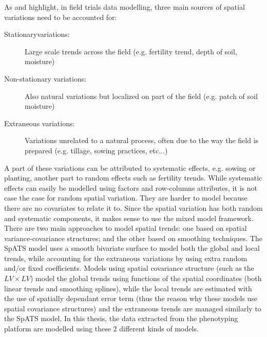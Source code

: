 As \textcite{wilkinson_nearest_1983} and \textcite{gilmour_accounting_1997} highlight, in field trials data modelling, three main sources of spatial variations need to be accounted for:
\begin{description}
    \item[Stationary\footnotemark variations:] Large scale trends across the field (e.g. fertility trend, depth of soil, moisture)
    \item[Non-stationary variations:] Also natural variations but localized on part of the field (e.g. patch of soil moisture)
    \item[Extraneous variations:] Variations unrelated to a natural process, often due to the way the field is prepared (e.g. 
    tillage, sowing practices, etc$\ldots$)
\end{description}
A part of these variations can be attributed to systematic effects, e.g. sowing or planting, another part to random effects such as fertility trends. While systematic effects can easily be modelled using factors and row-columns attributes, it is not case the case for random spatial variation. They are harder to model because there are no covariates to relate it to. Since the spatial variation has both random and systematic components, it makes sense to use the mixed model framework.\\

There are two main approaches to model spatial trends: one based on spatial variance-covariance structures; and the other based on smoothing techniques. The SpATS model uses a smooth bivariate surface to model both the global and local trends, while accounting for the extraneous variations by using extra random and/or fixed coefficients. Models using spatial covariance structure (such as the $LV\times LV$) model the global trends using functions of the spatial coordinates (both linear trends and smoothing splines), while the local trends are estimated with the use of spatially dependant error term (thus the reason why these models use spatial covariance structures) and the extraneous trends are managed similarly to the SpATS model. In this thesis, the data extracted from the phenotyping platform are modelled using these 2 different kinds of models.

